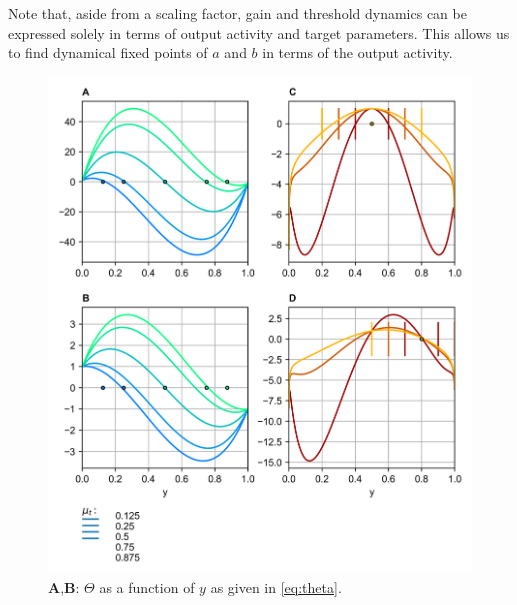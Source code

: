 \documentclass[10pt,a4paper]{article}
\begin{document}
Note that, aside from a scaling factor, gain and threshold dynamics can be expressed solely in terms of output activity and target parameters. This allows us to find dynamical fixed points of $a$ and $b$ in terms of the output activity.

\begin{figure}
\centering
\includegraphics[width=\textwidth]{./figures/gain_thresh_dyn.png}
\caption{\textbf{A},\textbf{B}: $\Theta$ as a function of $y$ as given in \eqref{eq:theta}. }
\end{figure}





\end{document}
